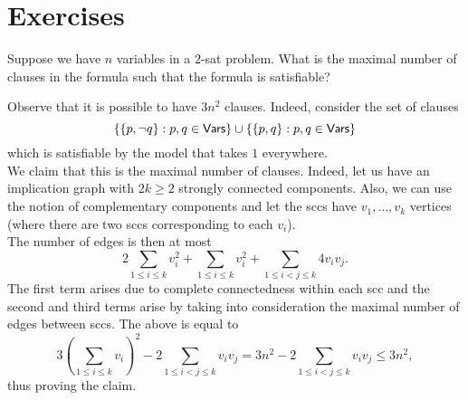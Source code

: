 \section{Exercises}

\begin{exercise}
	Suppose we have $n$ variables in a $2$-sat problem. What is the maximal number of clauses in the formula such that the formula is satisfiable?
\end{exercise}
\begin{solution*}
	Observe that it is possible to have $3n^2$ clauses. Indeed, consider the set of clauses
	\[ \{\{p,\neg q\} : p,q\in\mathsf{Vars}\}\cup\{\{p,q\} : p,q\in\mathsf{Vars}\} \]
	which is satisfiable by the model that takes $1$ everywhere.\\
	We claim that this is the maximal number of clauses. Indeed, let us have an implication graph with $2k\geq 2$ strongly connected components. Also, we can use the notion of complementary components and let the sccs have $v_1,\ldots,v_k$ vertices (where there are two sccs corresponding to each $v_i$).\\
	The number of edges is then at most
	\[ 2\sum_{1\leq i\leq k} v_i^2 + \sum_{1\leq i\leq k} v_i^2 + \sum_{1\leq i<j\leq k} 4 v_i v_j. \]
	The first term arises due to complete connectedness within each scc and the second and third terms arise by taking into consideration the maximal number of edges between sccs. The above is equal to
	\[ 3\left(\sum_{1\leq i\leq k} v_i\right)^2 - 2\sum_{1\leq i<j\leq k} v_i v_j = 3n^2 - 2\sum_{1\leq i<j\leq k} v_i v_j \leq 3n^2, \]
	thus proving the claim.
\end{solution*}